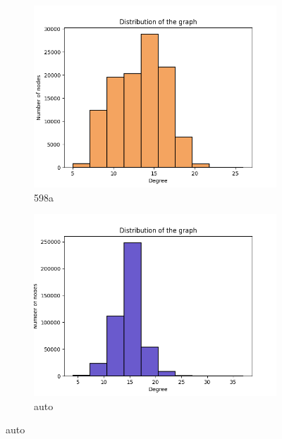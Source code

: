 \begin{figure}[h!]
\centering
\begin{subfigure}{.35\textwidth}
  \centering
  \includegraphics[width=\linewidth]{large_graphs/598a.png}  
  \caption{598a}
  \label{fig:sub-first}
\end{subfigure}
\begin{subfigure}{.35\textwidth}
  \centering
  \includegraphics[width=\linewidth]{large_graphs/auto.png}  
  \caption{auto}
  \label{fig:sub-second}
\end{subfigure}


\end{figure}
